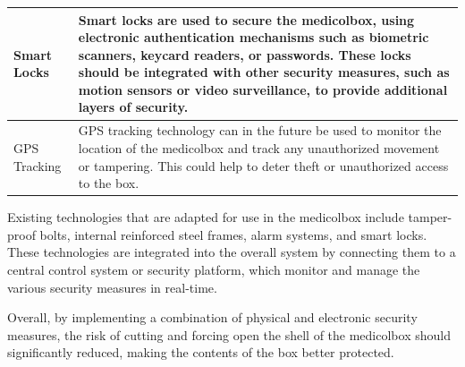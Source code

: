 \documentclass[../main.tex]{subfiles}
\begin{document}
\begin{table}[htbp]
\begin{tabular}{|l|p{10cm}|}
        Smart Locks &
        Smart locks are used to secure the \gls{medicolbox}, using electronic authentication mechanisms such as biometric scanners, keycard readers, or passwords. These locks should be integrated with other security measures, such as motion sensors or video surveillance, to provide additional layers of security. \\ \hline
        
        GPS Tracking &
        GPS tracking technology can in the future be used to monitor the location of the \gls{medicolbox} and track any unauthorized movement or tampering. This could help to deter theft or unauthorized access to the box. \\ \hline
    \end{tabular}
\end{table}

Existing technologies that are adapted for use in the \gls{medicolbox}
include tamper-proof bolts, internal reinforced steel frames,
alarm systems, and smart locks.
These technologies are integrated into the overall system
by connecting them to a central control system or security platform,
which monitor and manage the various security measures in real-time.

Overall, by implementing a combination of
physical and electronic security measures,
the risk of cutting and forcing open the shell of the \gls{medicolbox}
should significantly reduced,
making the contents of the box better protected.
\end{document}
